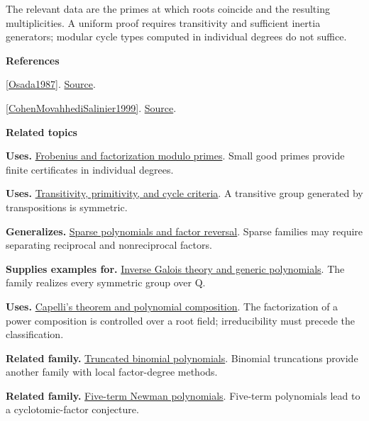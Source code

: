 \documentclass[11pt,a4paper,oneside,openany]{book}
\newenvironment{sources}{\par\smallskip\begingroup\footnotesize\color{atlasgray}\leftskip=10pt\setlength{\parskip}{2pt}}{\par\endgroup\smallskip}
\begin{document}
\color{black} The relevant data are the primes at which roots coincide and the resulting multiplicities. A uniform proof requires transitivity and sufficient inertia generators; modular cycle types computed in individual degrees do not suffice.\par
\begin{sources}
\textbf{References}\par\smallskip
\noindent\hyperlink{ref:Osada1987}{[Osada1987]}.  \href{https://doi.org/10.1016/0022-314X(87)90029-1}{Source}.\par
\noindent\hyperlink{ref:CohenMovahhediSalinier1999}{[CohenMovahhediSalinier1999]}.  \href{https://doi.org/10.1006/jabr.1999.8033}{Source}.\par
\end{sources}\color{black}
\par\medskip\begingroup\footnotesize\setlength{\parskip}{1pt}\textbf{\sffamily\color{atlasgreen}Related topics}\par
\color{black}\textbf{Uses.} \hyperlink{article:frobenius}{Frobenius and factorization modulo primes}. Small good primes provide finite certificates in individual degrees.\par
\color{black}\textbf{Uses.} \hyperlink{article:permutation-groups}{Transitivity, primitivity, and cycle criteria}. A transitive group generated by transpositions is symmetric.\par
\color{black}\textbf{Generalizes.} \hyperlink{article:sparse-gaps}{Sparse polynomials and factor reversal}. Sparse families may require separating reciprocal and nonreciprocal factors.\par
\color{black}\textbf{Supplies examples for.} \hyperlink{article:inverse-galois}{Inverse Galois theory and generic polynomials}. The family realizes every symmetric group over Q.\par
\color{black}\textbf{Uses.} \hyperlink{article:capelli-composition}{Capelli's theorem and polynomial composition}. The factorization of a power composition is controlled over a root field; irreducibility must precede the classification.\par
\color{black}\textbf{Related family.} \hyperlink{article:truncated-binomial}{Truncated binomial polynomials}. Binomial truncations provide another family with local factor-degree methods.\par
\color{black}\textbf{Related family.} \hyperlink{article:newman-pentanomials}{Five-term Newman polynomials}. Five-term polynomials lead to a cyclotomic-factor conjecture.\par
\endgroup
\end{document}
